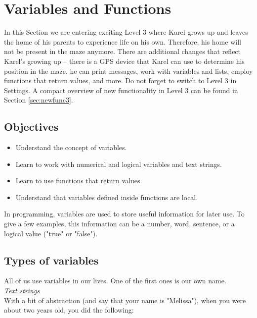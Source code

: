 
\section{Variables and Functions} \label{sec:var}

In this Section we are entering exciting Level 3 where Karel grows up and leaves the 
home of his parents to experience life on his own. Therefore, his home will not be 
present in the maze anymore. There are additional changes
that reflect Karel's growing up -- there is a GPS device that Karel can use to 
determine his position in the maze, he can print messages, work with variables and 
lists, employ functions that return values, and more. Do not forget to switch to 
Level 3 in Settings. A compact overview of new functionality in Level 3 can be found 
in Section \ref{sec:newfunc3}.

\subsection[\ \ Objectives]{Objectives} 
 
\begin{itemize}
\item Understand the concept of variables.
\item Learn to work with numerical and logical variables and text strings.
\item Learn to use functions that return values. 
\item Understand that variables defined inside functions are local. 
\end{itemize}

\noindent
In programming, variables are used to store useful information for later use. 
To give a few examples, this information can be a number, word, sentence, 
or a logical value ("true" or "false").

\subsection[\ \ Types of variables]{Types of variables}

All of us use variables in our lives. One of 
the first ones is our own name. \\

\noindent
\underline{\em Text strings}\\

\noindent
With a bit of abstraction (and say that your name is "Melissa"), 
when you were about two years old, you did the following:\\

